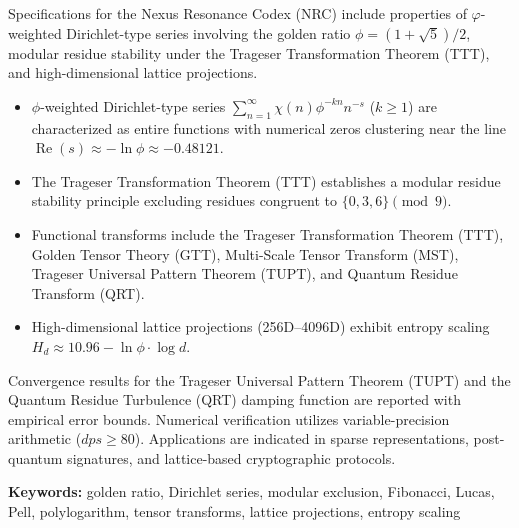 \begin{abstractbox}
	Specifications for the Nexus Resonance Codex (NRC) include properties of $\varphi$-weighted Dirichlet-type series involving the golden ratio $\phi = (1 + \sqrt{5})/2$, modular residue stability under the Trageser Transformation Theorem (TTT), and high-dimensional lattice projections.

	\begin{itemize}[leftmargin=*, label=\textcolor{accentorange}{\textbullet}]
		\item $\phi$-weighted Dirichlet-type series $\sum_{n=1}^\infty \chi(n) \phi^{-kn} n^{-s}$ ($k \ge 1$) are characterized as entire functions with numerical zeros clustering near the line $\operatorname{Re}(s) \approx -\ln\phi \approx -0.48121$.
		\item The Trageser Transformation Theorem (TTT) establishes a modular residue stability principle excluding residues congruent to $\{0, 3, 6\} \pmod 9$.
		\item Functional transforms include the Trageser Transformation Theorem (TTT), Golden Tensor Theory (GTT), Multi-Scale Tensor Transform (MST), Trageser Universal Pattern Theorem (TUPT), and Quantum Residue Transform (QRT).
		\item High-dimensional lattice projections (256D--4096D) exhibit entropy scaling $H_d \approx 10.96 - \ln\phi \cdot \log d$.
	\end{itemize}
	
	Convergence results for the Trageser Universal Pattern Theorem (TUPT) and the Quantum Residue Turbulence (QRT) damping function are reported with empirical error bounds. Numerical verification utilizes variable-precision arithmetic ($dps \ge 80$). Applications are indicated in sparse representations, post-quantum signatures, and lattice-based cryptographic protocols.

	\vspace{1em}
	\noindent\textbf{\textsf{Keywords:}} golden ratio, Dirichlet series, modular exclusion, Fibonacci, Lucas, Pell, polylogarithm, tensor transforms, lattice projections, entropy scaling
\end{abstractbox}